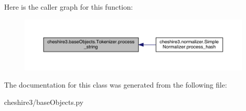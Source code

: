 Here is the caller graph for this function\-:
\nopagebreak
\begin{figure}[H]
\begin{center}
\leavevmode
\includegraphics[width=350pt]{classcheshire3_1_1base_objects_1_1_tokenizer_a6694a36e5e2164c7dd944aac85637125_icgraph}
\end{center}
\end{figure}




The documentation for this class was generated from the following file\-:\begin{DoxyCompactItemize}
\item 
cheshire3/base\-Objects.\-py\end{DoxyCompactItemize}

